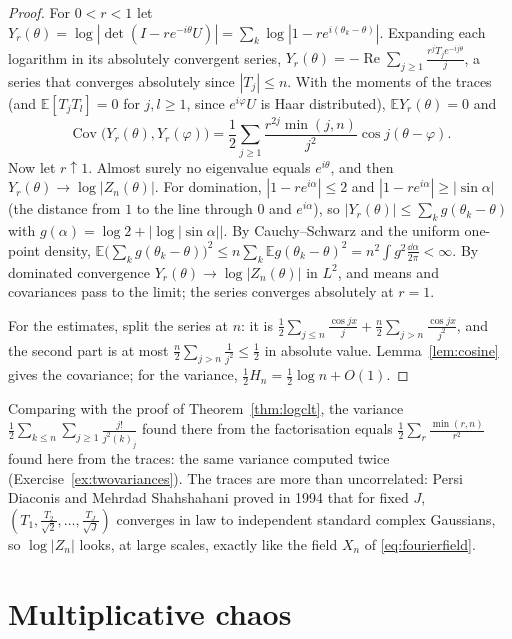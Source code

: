 \begin{proof}
For $0<r<1$ let $Y_r(\theta)=\log|\det(I-re^{-i\theta}U)|=\sum_k\log|1-re^{i(\theta_k-\theta)}|$. Expanding each logarithm in its absolutely convergent series, $Y_r(\theta)=-\operatorname{Re}\sum_{j\ge1}\frac{r^jT_je^{-ij\theta}}j$, a series that converges
absolutely since $|T_j|\le n$. With the moments of the traces (and $\mathbb E[T_jT_l]=0$ for $j,l\ge1$, since $e^{i\varphi}U$ is Haar distributed), $\mathbb EY_r(\theta)=0$ and
\[
\operatorname{Cov}\bigl(Y_r(\theta),Y_r(\varphi)\bigr)=\frac12\sum_{j\ge1}\frac{r^{2j}\min(j,n)}{j^2}\cos j(\theta-\varphi).
\]
Now let $r\uparrow1$. Almost surely no eigenvalue equals $e^{i\theta}$, and then $Y_r(\theta)\to\log|Z_n(\theta)|$. For domination, $|1-re^{i\alpha}|\le2$ and $|1-re^{i\alpha}|\ge|\sin\alpha|$ (the distance from $1$ to the line through $0$ and $e^{i\alpha}$), so
$|Y_r(\theta)|\le\sum_kg(\theta_k-\theta)$ with $g(\alpha)=\log2+|\log|\sin\alpha||$. By Cauchy--Schwarz and the uniform one-point density, $\mathbb E\bigl(\sum_kg(\theta_k-\theta)\bigr)^2\le n\sum_k\mathbb Eg(\theta_k-\theta)^2=n^2\int g^2\frac{\dd\alpha}{2\pi}<\infty$.
By dominated convergence $Y_r(\theta)\to\log|Z_n(\theta)|$ in $L^2$, and means and covariances pass to the limit; the series converges absolutely at $r=1$.

For the estimates, split the series at $n$: it is $\frac12\sum_{j\le n}\frac{\cos jx}j+\frac n2\sum_{j>n}\frac{\cos jx}{j^2}$, and the second part is at most $\frac n2\sum_{j>n}\frac1{j^2}\le\frac12$ in absolute value. Lemma~\ref{lem:cosine} gives the
covariance; for the variance, $\frac12H_n=\frac12\log n+O(1)$.
\end{proof}

Comparing with the proof of Theorem~\ref{thm:logclt}, the variance $\frac12\sum_{k\le n}\sum_{j\ge1}\frac{j!}{j^2(k)_j}$ found there from the factorisation equals $\frac12\sum_{r}\frac{\min(r,n)}{r^2}$ found here from the traces: the same variance computed twice (Exercise~\ref{ex:twovariances}). The traces are more than uncorrelated: Persi Diaconis and Mehrdad Shahshahani proved in 1994 that for
fixed $J$, $(T_1,\frac{T_2}{\sqrt2},\dots,\frac{T_J}{\sqrt J})$ converges in law to independent standard complex Gaussians, so $\log|Z_n|$ looks, at large scales, exactly like the field $X_n$ of \eqref{eq:fourierfield}.

\section{Multiplicative chaos}

